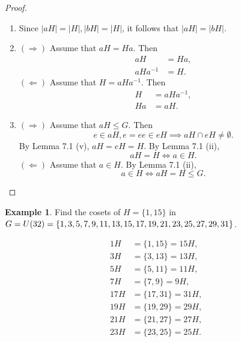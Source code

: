 \documentclass{article}
\theoremstyle{definition}
\newtheorem{example}{Example}[section]
\begin{document}
\begin{proof}
\begin{enumerate}[label=(\roman*)]
             \item Since $|aH| = |H|, |bH| = |H|$, it follows that $|aH| = |bH|$.
             
             \item $(\Rightarrow)$ Assume that $aH=Ha$. Then
             \begin{align*}
                 aH &= Ha, \\
                 aHa^{-1} &= H.
             \end{align*}
             $(\Leftarrow)$ Assume that $H=aHa^{-1}$. Then
             \begin{align*}
                 H &= aHa^{-1}, \\
                 Ha &= aH.
             \end{align*}
             
             \item $(\Rightarrow)$ Assume that $aH \leq G$. Then
             \begin{equation*}
                e \in aH, e = ee \in eH \implies aH \cap eH \neq \emptyset.
             \end{equation*}
             By Lemma 7.1 (v), $aH = eH = H$. By Lemma 7.1 (ii),
             \begin{equation*}
                 aH=H \iff a \in H.
             \end{equation*}
             $(\Leftarrow)$ Assume that $a \in H$. By Lemma 7.1 (ii),
             \begin{equation*}
                 a \in H \iff aH = H \leq G.
             \end{equation*}
         \end{enumerate}
     \end{proof}
     
     \begin{example}
         Find the cosets of $H = \{1,15\}$ in $G = U(32) = \{1,3,5,7,9,11,13,15,17,19, \\ 21,23,25,27,29,31\}$.
         
         \begin{align*}
             1H &= \{1,15\} = 15H, \\
             3H &= \{3,13\} = 13H, \\
             5H &= \{5,11\} = 11H, \\
             7H &= \{7,9\} = 9H, \\
             17H &= \{17, 31\} = 31H, \\
             19H &= \{19, 29\} = 29H, \\
             21H &= \{21, 27\} = 27H, \\
             23H &= \{23, 25\} = 25H. \\
         \end{align*}
     \end{example}
     
\end{document}
